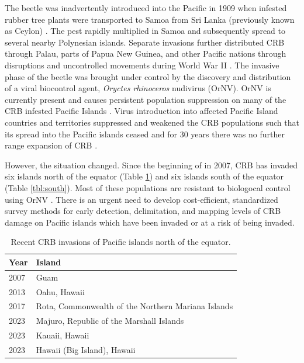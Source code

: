 \documentclass[11pt,english,letterpaper]{scrartcl}
\begin{document}
The beetle was inadvertently introduced into the Pacific in 1909 when infested rubber tree plants were transported to Samoa from Sri Lanka (previously known as Ceylon) \cite{Catley1969}. The pest rapidly multiplied in Samoa and subsequently spread to several nearby Polynesian islands. Separate invasions further distributed CRB through Palau, parts of Papua New Guinea, and other Pacific nations through disruptions and uncontrolled movements during World War II \cite{Catley1969,Gressitt1953}. The invasive phase of the beetle was brought under control by the discovery and distribution of a viral biocontrol agent, \textit{Oryctes rhinoceros} nudivirus (OrNV). OrNV is currently present and causes persistent population suppression on many of the CRB infested Pacific Islands \cite{Bedford2013b,Huger2005}. Virus introduction into affected Pacific Island countries and territories suppressed and weakened the CRB populations such that its spread into the Pacific islands ceased and for 30 years there was no further range expansion of CRB \cite{Vaqalo2015}. 

However, the situation changed. Since the beginning of in 2007, CRB has invaded six islands north of the equator (Table \ref{tbl:north}) and six islands south of the equator (Table \ref{tbl:south}). Most of these populations are resistant to biologocal control using OrNV \cite{Marshall2017}. There is an urgent need to develop cost-efficient, standardized survey methods for early detection, delimitation, and mapping levels of CRB damage on Pacific islands which have been invaded or at a risk of being invaded. 

\begin{table}[H]
	\centering
	\caption{Recent CRB invasions of Pacific islands north of the equator.}	
	
	\begin{tabular}{ll}
		\toprule
		\textbf{Year} & \textbf{Island} \\ \midrule
		2007 & Guam \\			
		2013 & Oahu, Hawaii \\
		2017 & Rota, Commonwealth of the Northern Mariana Islands \\
		2023 & Majuro, Republic of the Marshall Islands \\
		2023 & Kauaii, Hawaii \\
		2023 & Hawaii (Big Island), Hawaii \\ \bottomrule		
	\end{tabular}
	\label{tbl:north}	
\end{table}
\end{document}

